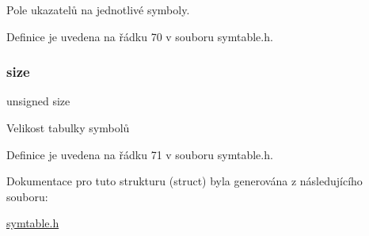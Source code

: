 Pole ukazatelů na jednotlivé symboly. 



Definice je uvedena na řádku 70 v souboru symtable.\+h.

\mbox{\label{struct_s___symbol_table_a245260f6f74972558f61b85227df5aae}} 
\subsubsection{\texorpdfstring{size}{size}}
{\footnotesize\ttfamily unsigned size}



Velikost tabulky symbolů 



Definice je uvedena na řádku 71 v souboru symtable.\+h.



Dokumentace pro tuto strukturu (struct) byla generována z následujícího souboru\+:\begin{DoxyCompactItemize}
\item 
\hyperlink{symtable_8h}{symtable.\+h}\end{DoxyCompactItemize}

